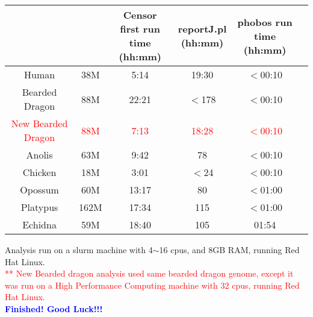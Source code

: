 \documentclass[12pt]{report}
\begin{document}
\footnotesize  %
\setlength\tabcolsep{1.5pt}
\begin{center}
	\begin{tabular}{ | c | c | c | c| c |c|}
		\hline
		\thead{Genome}	& 	\thead{Consensus sequences size}	&	\thead{Censor first run \\ time (hh:mm)}	&	\thead{reportJ.pl \\ (hh:mm)}	&	\thead{phobos run time \\ (hh:mm)} \\
		\hline
		Human	&	38M	&	5:14	&	19:30	&	$<$00:10 \\
		\hline 
		Bearded Dragon	&	88M	&	22:21	&	$<$178	&	$<$00:10 \\
		\hline
		\textcolor{red}{New Bearded Dragon}	&	\textcolor{red}{88M}	&	\textcolor{red}{7:13}	&	\textcolor{red}{18:28}	&	\textcolor{red}{$<$00:10} \\
		\hline
		Anolis	&	63M	&	9:42	&	78	&	$<$00:10 \\
		\hline
		Chicken	&	18M	&	3:01	&	$<$24	&	$<$00:10 \\
		\hline
		Opossum	&	60M	&	13:17	&	80	&	$<$01:00 \\
		\hline
		Platypus	&	162M	&	17:34	&	115	&	$<$01:00 \\
		\hline
		Echidna	&	59M	&	18:40	&	105	&	01:54 \\
		\hline
	\end{tabular}
\end{center}

\noindent * Analysis run on a slurm machine with 4$\sim$16 cpus, and 8GB RAM, running Red Hat Linux.\\
\textcolor{red}{** New Bearded dragon analysis used same bearded dragon genome, except it was run on a High Performance Computing machine with 32 cpus, running Red Hat Linux.} \\


\textbf{\textcolor{blue}{ \Large Finished! Good Luck!!!}}
\end{document}
